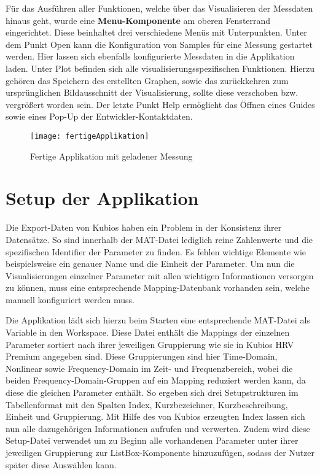 Für das Ausführen aller Funktionen, welche über das Visualisieren der Messdaten hinaus geht, wurde eine \textbf{Menu-Komponente} am oberen Fensterrand eingerichtet. Diese beinhaltet drei verschiedene Menüs mit Unterpunkten. Unter dem Punkt \glqq Open\grqq{} kann die Konfiguration von Samples für eine Messung gestartet werden. Hier lassen sich ebenfalls konfigurierte Messdaten in die Applikation laden. Unter \glqq Plot\grqq{} befinden sich alle visualisierungsspezifischen Funktionen. Hierzu gehören das Speichern des erstellten Graphen, sowie das zurückkehren zum ursprünglichen Bildausschnitt der Visualisierung, sollte diese verschoben bzw. vergrößert worden sein. Der letzte Punkt \glqq Help\grqq{} ermöglicht das Öffnen eines Guides sowie eines Pop-Up der Entwickler-Kontaktdaten.

\begin{figure}[H]
	\centering
	\texttt{[image: fertigeApplikation]}
	\caption{Fertige Applikation mit geladener Messung}
	\label{fig:fertigeApplikation}
\end{figure}

\section{Setup der Applikation}

Die Export-Daten von Kubios haben ein Problem in der Konsistenz ihrer Datensätze. So sind innerhalb der MAT-Datei lediglich reine Zahlenwerte und die spezifischen Identifier der Parameter zu finden. Es fehlen wichtige Elemente wie beispielsweise ein genauer Name und die Einheit der Parameter. Um nun die Visualisierungen einzelner Parameter mit allen wichtigen Informationen versorgen zu können, muss eine entsprechende Mapping-Datenbank vorhanden sein, welche manuell konfiguriert werden muss.

Die Applikation lädt sich hierzu beim Starten eine entsprechende MAT-Datei als Variable in den Workspace. Diese Datei enthält die Mappings der einzelnen Parameter sortiert nach ihrer jeweiligen Gruppierung wie sie in Kubios HRV Premium angegeben sind. Diese Gruppierungen sind hier Time-Domain, Nonlinear sowie Frequency-Domain im Zeit- und Frequenzbereich, wobei die beiden Frequency-Domain-Gruppen auf ein Mapping reduziert werden kann, da diese die gleichen Parameter enthält. So ergeben sich drei Setupstrukturen im Tabellenformat mit den Spalten Index, Kurzbezeichner, Kurzbeschreibung, Einheit und Gruppierung. Mit Hilfe des von Kubios erzeugten Index lassen sich nun alle dazugehörigen Informationen aufrufen und verwerten. Zudem wird diese Setup-Datei verwendet um zu Beginn alle vorhandenen Parameter unter ihrer jeweiligen Gruppierung zur ListBox-Komponente hinzuzufügen, sodass der Nutzer später diese Auswählen kann.

